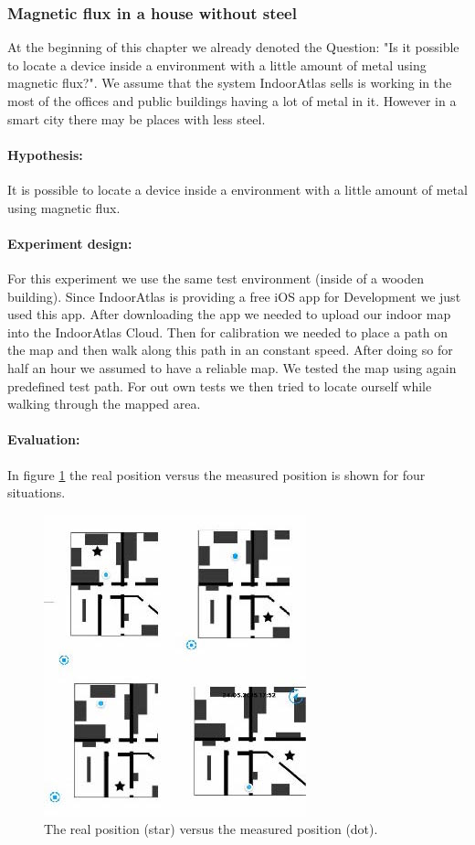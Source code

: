 \subsubsection{Magnetic flux in a house without steel}
At the beginning of this chapter we already denoted the Question: "Is it possible to locate a device inside a environment with a little amount of metal using magnetic flux?". We assume that the system IndoorAtlas sells is working in the most of the offices and public buildings having a lot of metal in it. However in a smart city there may be places with less steel. 

\paragraph{Hypothesis: } It is possible to locate a device inside a environment with a little amount of metal using magnetic flux.

\paragraph{Experiment design: } 
For this experiment we use the same test environment (inside of a wooden building). Since IndoorAtlas is providing a free iOS app for Development we just used this app. After downloading the app we needed to upload our indoor map into the IndoorAtlas Cloud. Then for calibration we needed to place a path on the map and then walk along this path in an constant speed. After doing so for half an hour we assumed to have a reliable map. We tested the map using again predefined test path. 
For out own tests we then tried to locate ourself while walking through the mapped area.

\paragraph{Evaluation: }
In figure \ref{fig:magneticX} the real position versus the measured position is shown for four situations.

\begin{figure}[h]
	\centering
		\includegraphics[width=.6\textwidth]{images/experiments/magnetic.jpg}
	\caption{The real position (star) versus the measured position (dot).}
	\label{fig:magneticX}
\end{figure}

